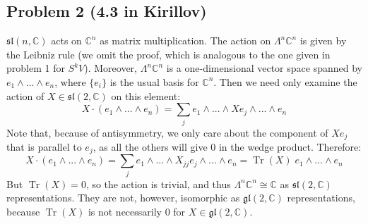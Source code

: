 \documentclass[12 pt]{article}
\newcommand{\C}{\mathbb{C}}
\DeclareMathOperator{\Tr}{Tr}
\begin{document}
\subsection*{Problem 2 (4.3 in Kirillov)}
$\mathfrak{sl}(n,\C)$ acts on $\C^n$ as matrix multiplication. The action on $\Lambda^n \C^n$ is given by the Leibniz rule (we omit the proof, which is analogous to the one given in problem 1 for $S^k V$). Moreover, $\Lambda^n \C^n$ is a one-dimensional vector space spanned by $e_1 \wedge ... \wedge e_n$, where $\{e_i\}$ is the usual basis for $\C^n$. Then we need only examine the action of $X \in \mathfrak{sl}(2, \C)$ on this element:
\[          X \cdot ( e_1 \wedge ... \wedge e_n)  = \sum_j  e_1 \wedge ... \wedge Xe_j \wedge ... \wedge e_n    \]
Note that, because of antisymmetry, we only care about the component of $X e_j$ that is parallel to $e_j$, as all the others will give 0 in the wedge product. Therefore:
\[         X \cdot ( e_1 \wedge ... \wedge e_n)  = \sum_j  e_1 \wedge ... \wedge X_{jj} e_j \wedge ... \wedge e_n  = \Tr(X) \; e_1 \wedge ... \wedge e_n \]     
But $\Tr(X) = 0$, so the action is trivial, and thus $\Lambda^n \C^n \cong \C$ as $\mathfrak{sl}(2,\C)$ representations. They are not, however, isomorphic as $\mathfrak{gl}(2,\C)$ representations, because $\Tr(X)$ is not necessarily 0 for $X \in \mathfrak{gl}(2,\C)$.
\end{document}
